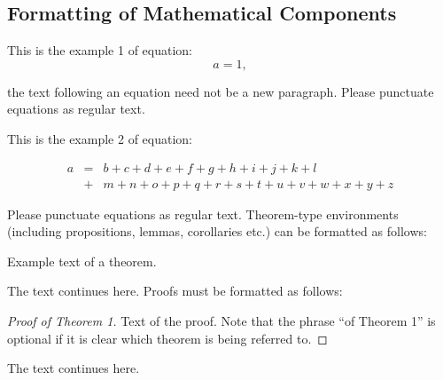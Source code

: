 \begin{paracol}{2}
\subsection{Formatting of Mathematical Components}

This is the example 1 of equation:
\begin{equation}
a = 1,
\end{equation}

the text following an equation need not be a new paragraph. Please punctuate equations as regular text.

This is the example 2 of equation:
\end{paracol}
\nointerlineskip
\begin{eqnarray}
a &=& b + c + d + e + f + g + h + i + j + k + l\nonumber \\
 &+& m + n + o + p + q + r + s + t + u + v + w + x + y + z %
\end{eqnarray}






\begin{paracol}{2}
\linenumbers
\switchcolumn
Please punctuate equations as regular text. Theorem-type environments (including propositions, lemmas, corollaries etc.) can be formatted as follows:
\begin{Theorem}
Example text of a theorem.
\end{Theorem}

The text continues here. Proofs must be formatted as follows:

\begin{proof}[Proof of Theorem 1]
Text of the proof. Note that the phrase ``of Theorem 1'' is optional if it is clear which theorem is being referred to.
\end{proof}
The text continues here.

\end{paracol}
